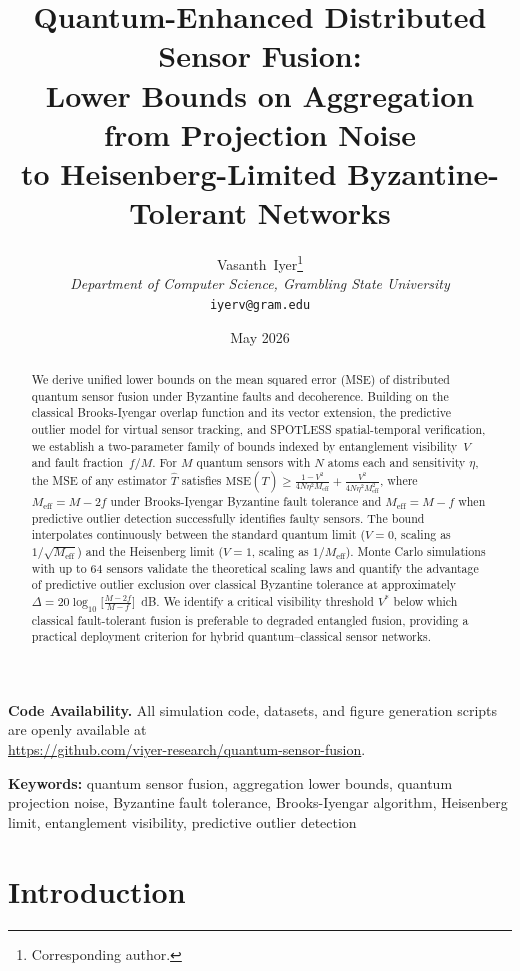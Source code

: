 \documentclass[twocolumn,11pt]{article}
\title{\textbf{Quantum-Enhanced Distributed Sensor Fusion:\\
Lower Bounds on Aggregation from Projection Noise\\
to Heisenberg-Limited Byzantine-Tolerant Networks}}
\author{
    Vasanth~Iyer\thanks{Corresponding author.}\\
    \textit{Department of Computer Science, Grambling State University}\\
    \texttt{iyerv@gram.edu}
}
\date{May 2026}
\begin{document}
\maketitle

\begin{abstract}
We derive unified lower bounds on the mean squared error (MSE) of
distributed quantum sensor fusion under Byzantine faults and decoherence.
Building on the classical Brooks-Iyengar overlap function and its vector
extension, the predictive outlier model for virtual sensor tracking,
and SPOTLESS spatial-temporal verification, we establish a two-parameter
family of bounds indexed by entanglement visibility~$V$ and fault
fraction~$f/M$.
For $M$ quantum sensors with $N$ atoms each and sensitivity $\eta$,
the MSE of any estimator $\hat{T}$ satisfies
$\mathrm{MSE}(\hat{T}) \geq
\frac{1-V^2}{4N\eta^2 M_{\mathrm{eff}}}
+ \frac{V^2}{4N\eta^2 M_{\mathrm{eff}}^2}$,
where $M_{\mathrm{eff}} = M - 2f$ under Brooks-Iyengar Byzantine
fault tolerance and $M_{\mathrm{eff}} = M - f$ when predictive outlier
detection successfully identifies faulty sensors.
The bound interpolates continuously between the standard quantum limit
($V=0$, scaling as $1/\sqrt{M_{\mathrm{eff}}}$) and the Heisenberg
limit ($V=1$, scaling as $1/M_{\mathrm{eff}}$).
Monte Carlo simulations with up to 64 sensors validate the theoretical
scaling laws and quantify the advantage of predictive outlier exclusion
over classical Byzantine tolerance at approximately
$\Delta = 20\log_{10}\!\bigl[\frac{M-2f}{M-f}\bigr]$~dB.
We identify a critical visibility threshold $V^*$ below which classical
fault-tolerant fusion is preferable to degraded entangled fusion,
providing a practical deployment criterion for hybrid quantum--classical
sensor networks.
\end{abstract}

\smallskip
\noindent\textbf{Code Availability.}
All simulation code, datasets, and figure generation scripts are openly available at\\
\url{https://github.com/viyer-research/quantum-sensor-fusion}.

\textbf{Keywords:} quantum sensor fusion, aggregation lower bounds,
quantum projection noise, Byzantine fault tolerance, Brooks-Iyengar
algorithm, Heisenberg limit, entanglement visibility, predictive
outlier detection


\section{Introduction}
\label{sec:intro}
\end{document}
